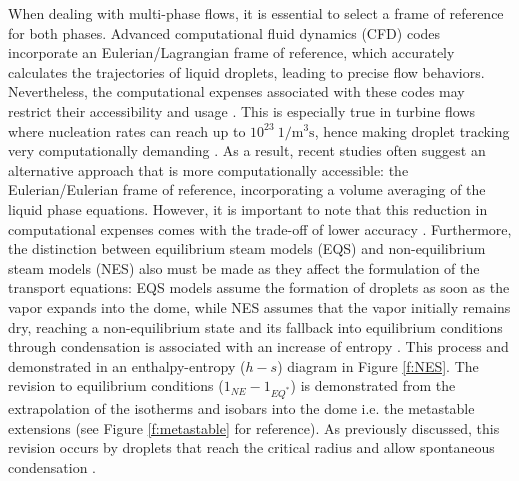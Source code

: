 \documentclass[12pt]{article}
\numberwithin{equation}{section}
\begin{document}
When dealing with multi-phase flows, it is essential to select a frame of reference for both phases. Advanced computational fluid dynamics (CFD) codes incorporate an Eulerian/Lagrangian frame of reference, which accurately calculates the trajectories of liquid droplets, leading to precise flow behaviors. Nevertheless, the computational expenses associated with these codes may restrict their accessibility and usage \cite{francesco2017cfd}. This is especially true in turbine flows where nucleation rates can reach up to $10^{23}\:\mathrm{1/m^{3}s}$, hence making droplet tracking very computationally demanding \cite{francesco2017cfd}. As a result, recent studies often suggest an alternative approach that is more computationally accessible: the Eulerian/Eulerian frame of reference, incorporating a volume averaging of the liquid phase equations. However, it is important to note that this reduction in computational expenses comes with the trade-off of lower accuracy \cite{francesco2017cfd}.  Furthermore, the distinction between equilibrium steam models (EQS) and non-equilibrium steam models (NES) also must be made as they affect the formulation of the transport equations: EQS models assume the formation of droplets as soon as the vapor expands into the dome, while NES assumes that the vapor initially remains dry, reaching a non-equilibrium state and its fallback into equilibrium conditions through condensation is associated with an increase of entropy \cite{starzmann2010non}. This process and demonstrated in an enthalpy-entropy ($h-s$) diagram in Figure \ref{f:NES}. The revision to equilibrium conditions ($1_{NE}-1_{EQ^{*}}$) is demonstrated from the extrapolation of the isotherms and isobars into the dome i.e. the metastable extensions (see Figure \ref{f:metastable} for reference). As previously discussed, this revision occurs by droplets that reach the critical radius and allow spontaneous condensation \cite{starzmann2010non}.
\end{document}
